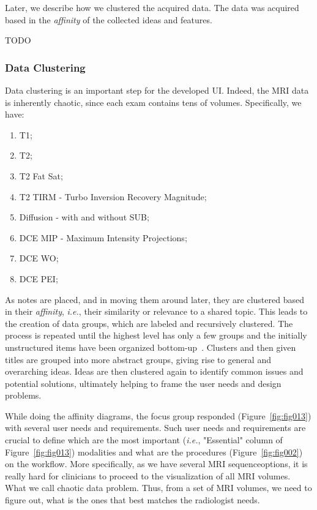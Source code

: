 Later, we describe how we clustered the acquired data.
The data was acquired based in the {\it affinity} of the collected ideas and features.

TODO

\subsubsection{Data Clustering}
\label{sec:clustering}

Data clustering is an important step for the developed UI.
Indeed, the MRI data is inherently chaotic, since each exam contains tens of volumes.
Specifically, we have:

\begin{multicols}{2}
\begin{enumerate}
\item T1;
\item T2;
\item T2 Fat Sat;
\item T2 TIRM - Turbo Inversion Recovery Magnitude;
\item Diffusion - with and without SUB;
\item DCE MIP - Maximum Intensity Projections;
\item DCE WO;
\item DCE PEI;
\end{enumerate}
\end{multicols}

As notes are placed, and in moving them around later, they are clustered based in their {\it affinity}, {\it i.e.}, their similarity or relevance to a shared topic.
This leads to the creation of data groups, which are labeled and recursively clustered.
The process is repeated until the highest level has only a few groups and the initially unstructured items have been organized bottom-up~\cite{harrington2016affinity, 10.1145/3290605.3300628, 10.1145/3173574.3173704}.
Clusters and then given titles are grouped into more abstract groups, giving rise to general and overarching ideas.
Ideas are then clustered again to identify common issues and potential solutions, ultimately helping to frame the user needs and design problems.

While doing the affinity diagrams, the focus group responded (Figure~\ref{fig:fig013}) with several user needs and requirements.
Such user needs and requirements are crucial to define which are the most important ({\it i.e.}, "Essential" column of Figure~\ref{fig:fig013}) modalities and what are the procedures (Figure~\ref{fig:fig002}) on the workflow.
More specifically, as we have several MRI sequence\footnotemark[18] options, it is really hard for clinicians to proceed to the visualization of all MRI volumes.
What we call chaotic data problem.
Thus, from a set of MRI volumes, we need to figure out, what is the ones that best matches the radiologist needs.

